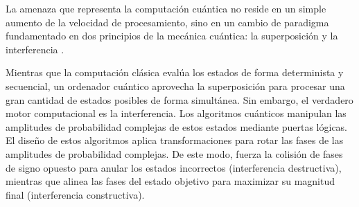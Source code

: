 \documentclass[11pt, a4paper]{report}
\theoremstyle{definition}
\begin{document}
La amenaza que representa la computación cuántica no reside en un simple aumento de la velocidad de procesamiento, sino en un cambio de paradigma fundamentado en dos principios de la mecánica cuántica: la superposición y la interferencia \cite{nielsen2010quantum}. 

Mientras que la computación clásica evalúa los estados de forma determinista y secuencial, un ordenador cuántico aprovecha la superposición para procesar una gran cantidad de estados posibles de forma simultánea. Sin embargo, el verdadero motor computacional es la interferencia. Los algoritmos cuánticos manipulan las amplitudes de probabilidad complejas de estos estados mediante puertas lógicas. El diseño de estos algoritmos aplica transformaciones para rotar las fases de las amplitudes de probabilidad complejas. De este modo, fuerza la colisión de fases de signo opuesto para anular los estados incorrectos (interferencia destructiva), mientras que alinea las fases del estado objetivo para maximizar su magnitud final (interferencia constructiva).
\end{document}
